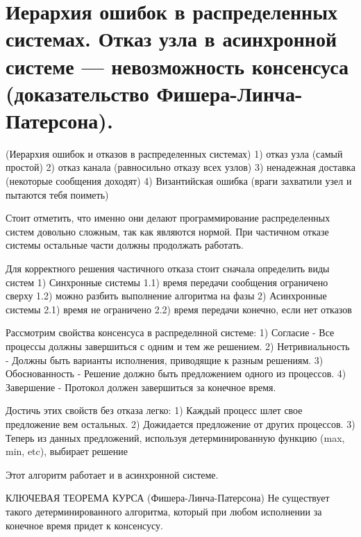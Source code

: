 \section{Иерархия ошибок в распределенных системах. Отказ узла в асинхронной системе --- невозможность консенсуса (доказательство Фишера-Линча-Патерсона).}


\begin{algorithm}(Иерархия ошибок и отказов в распределенных системах)
    1) отказ узла (самый простой)
    2) отказ канала (равносильно отказу всех узлов)
    3) ненадежная доставка (некоторые сообщения доходят)
    4) Византийская ошибка (враги захватили узел и пытаются тебя поиметь)
\end{algorithm}

Стоит отметить, что именно они делают программирование распределенных систем довольно сложным, так как являются нормой. При частичном отказе системы остальные части должны продолжать работать. 

Для корректного решения частичного отказа стоит сначала определить виды систем
1) Синхронные системы 
1.1) время передачи сообщения ограничено сверху
1.2) можно разбить выполнение алгоритма на фазы
2) Асинхронные системы
2.1) время не ограничено
2.2) время передачи конечно, если нет отказов

Рассмотрим свойства консенсуса в распределнной системе:
1) Согласие - Все процессы должны завершиться с одним и тем же решением.
2) Нетривиальность - Должны быть варианты исполнения, приводящие к разным решениям.
3) Обоснованность - Решение должно быть предложением одного из процессов.
4) Завершение - Протокол должен завершиться за конечное время.

Достичь этих свойств без отказа легко:
1) Каждый процесс шлет свое предложение вем остальных.
2) Дожидается предложение от других процессов.
3) Теперь из данных предложений, используя детерминированную функцию (max, min, etc), выбирает решение

Этот алгоритм работает и в асинхронной системе.

КЛЮЧЕВАЯ ТЕОРЕМА КУРСА (Фишера-Линча-Патерсона)
Не существует такого детерминированного алгоритма, который при любом исполнении за конечное время придет к консенсусу.

